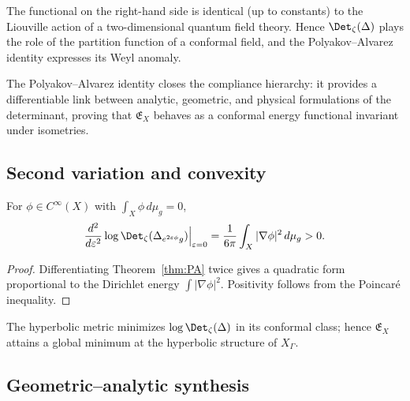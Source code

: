 \begin{remark}
\label{rem:PA-physics}
The functional on the right-hand side is identical (up to constants) to the Liouville action of a two-dimensional quantum field theory.  
Hence $\Det_\zeta(\Delta)$ plays the role of the partition function of a conformal field, and the Polyakov–Alvarez identity expresses its Weyl anomaly. \relax
\end{remark}

\begin{invariant}
\label{inv:C14}
The Polyakov–Alvarez identity closes the compliance hierarchy: it provides a differentiable link between analytic, geometric, and physical formulations of the determinant, proving that $\mathfrak{E}_X$ behaves as a conformal energy functional invariant under isometries. \relax
\end{invariant}

\subsection{Second variation and convexity}
\label{subsec:ch4-part7-secondvar} \relax

\begin{theorem}
\label{thm:second-variation2}
For $\phi\in C^\infty(X)$ with $\int_X\phi\,d\mu_g=0$,
\[
\frac{d^2}{d\varepsilon^2}\log\Det_\zeta(\Delta_{e^{2\varepsilon\phi}g})\Big|_{\varepsilon=0}
= \frac{1}{6\pi}\int_X |\nabla\phi|^2\,d\mu_g >0.
\]
\end{theorem}

\begin{proof}\relax
Differentiating Theorem~\ref{thm:PA} twice gives a quadratic form proportional to the Dirichlet energy $\int|\nabla\phi|^2$.  
Positivity follows from the Poincaré inequality. \relax
\end{proof}

\begin{corollary}
\label{cor:stability}
The hyperbolic metric minimizes $\log\Det_\zeta(\Delta)$ in its conformal class; hence $\mathfrak{E}_X$ attains a global minimum at the hyperbolic structure of $X_\Gamma$. \relax
\end{corollary}

\subsection{Geometric–analytic synthesis}
\label{subsec:ch4-part7-synthesis} \relax

